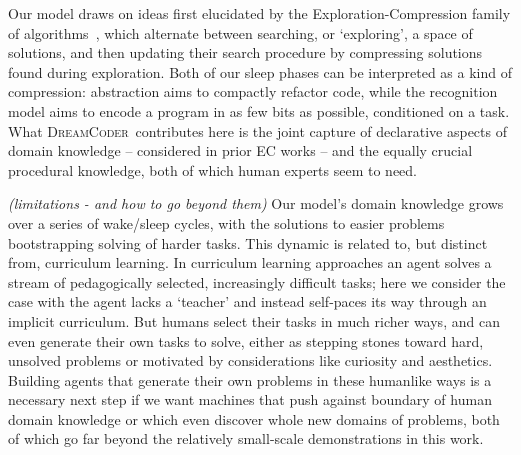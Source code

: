 \documentclass{article}
\newcommand{\system}{\textsc{DreamCoder}~}
\newcommand{\systemEnding}{\textsc{DreamCoder}}
\begin{document}
Our model draws on ideas first elucidated by the
Exploration-Compression family of algorithms~\cite{Dechter:2013:BLV:2540128.2540316,ecc,lazaro2019beyond,DBLP:conf/icml/LiangJK10,solomonoff1989system,schmidhuber2004optimal,ozkural2011teraflop},
which alternate
between searching, or `exploring', a space of solutions, and then
updating their search procedure by compressing solutions found during
exploration.  Both of our sleep phases can be interpreted as a kind of
compression: abstraction aims to compactly refactor code, while the
recognition model aims to encode a program in as few bits as possible,
conditioned on a task. What \system contributes here is the joint capture of
declarative aspects of domain knowledge -- considered in prior EC works -- and
the equally crucial procedural knowledge,
both of which human experts seem to need.







\emph{(limitations - and how to go beyond them)} Our model's domain knowledge grows over a series of wake/sleep cycles,
with the solutions to easier problems bootstrapping
solving of harder tasks.
This dynamic is related to, but distinct from, curriculum learning. In curriculum learning approaches an agent solves a stream of pedagogically selected, increasingly difficult tasks; here we consider the case with the agent lacks a `teacher' and instead self-paces its way through an implicit curriculum.
But humans select their tasks in much richer ways,
and can even generate their own tasks to solve,
either as stepping stones toward hard, unsolved problems or motivated by considerations like curiosity and aesthetics.
Building agents that generate their own problems in these humanlike ways is a necessary next step
if we want machines that push against boundary of human domain knowledge or which even discover whole new domains of problems,
both of which go far beyond the relatively small-scale demonstrations in this work.
\end{document}
